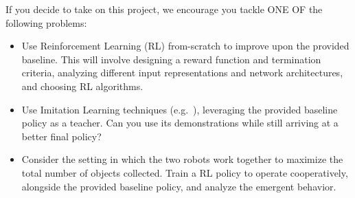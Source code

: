 \documentclass[a4paper]{article}
\begin{document}
If you decide to take on this project, we encourage you tackle ONE OF the following problems:
\begin{itemize}
  \item Use Reinforcement Learning (RL) from-scratch to improve upon the provided baseline. 
  This will involve designing a reward function and termination criteria, analyzing different input representations and network architectures, and choosing RL algorithms.
  \item Use Imitation Learning techniques (e.g.~\cite{Ross2010-ny}), leveraging the provided baseline policy as a teacher. 
  Can you use its demonstrations while still arriving at a better final policy?
  \item Consider the setting in which the two robots work together to maximize the total number of objects collected. 
  Train a RL policy to operate cooperatively, alongside the provided baseline policy, and analyze the emergent behavior.
\end{itemize} 





\end{document}
